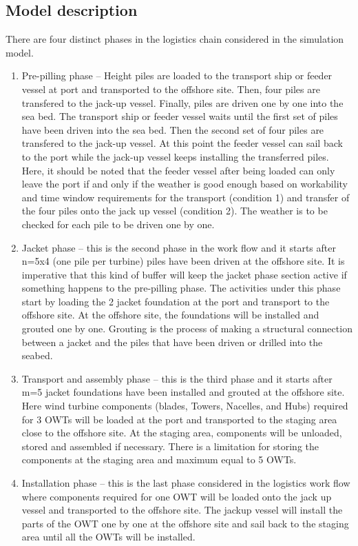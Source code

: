 \subsection{Model description}
There are four distinct phases in the logistics chain considered in the simulation model.
\begin{enumerate}
\item Pre-pilling phase -- Height piles are loaded to the transport ship or feeder vessel at port and transported to the offshore site. Then, four piles are transfered to the jack-up vessel. Finally, piles are driven one by one into the sea bed. The transport ship or feeder vessel waits until the first set of piles have been driven into the sea bed. Then the second set of four piles are transfered to the jack-up vessel. At this point the feeder vessel can sail back to the port while the jack-up vessel keeps installing the transferred piles. Here, it should be noted that the feeder vessel after being loaded can only leave the port if and only if the weather is good enough based on workability and time window requirements for the transport (condition 1) and transfer of the four piles onto the jack up vessel (condition 2). The weather is to be checked for each pile to be driven one by one.
\item Jacket phase -- this is the second phase in the work flow and it starts after n=5x4 (one pile per turbine) piles have been driven at the offshore site. It is imperative that this kind of buffer will keep the jacket phase section active if something happens to the pre-pilling phase. The activities under this phase start by loading the 2 jacket foundation at the port and transport to the offshore site. At the offshore site, the foundations will be installed and grouted one by one. Grouting is the process of making a structural connection between a jacket and the piles that have been driven or drilled into the seabed.
\item Transport and assembly phase -- this is the third phase and it starts after m=5 jacket foundations have been installed and grouted at the offshore site. Here wind turbine components (blades, Towers, Nacelles, and Hubs) required for 3 OWTs will be loaded at the port and transported to the staging area close to the offshore site. At the staging area, components will be unloaded, stored and assembled if necessary. There is a limitation for storing the components at the staging area and maximum equal to 5 OWTs.
\item Installation phase -- this is the last phase considered in the logistics work flow where components required for one OWT will be loaded onto the jack up vessel and transported to the offshore site.  The jackup vessel will install the parts of the OWT one by one at the offshore site and sail back to the staging area until all the OWTs will be installed.
\end{enumerate}